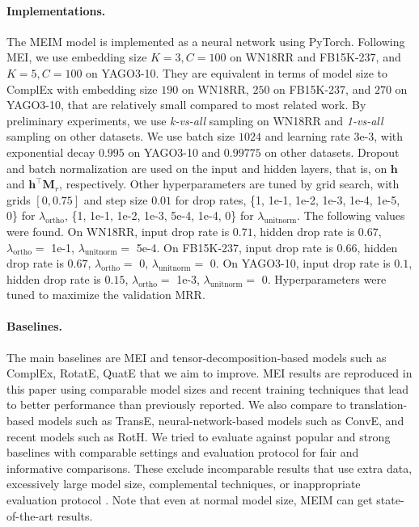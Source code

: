 \documentclass{article}
\def\vh{{\bm{h}}}
\def\mM{{\bm{M}}}
\theoremstyle{plain}
\theoremstyle{remark}
\begin{document}
\paragraph{Implementations.} The MEIM model is implemented as a neural network using PyTorch. Following MEI, we use embedding size $ K=3, C=100 $ on WN18RR and FB15K-237, and $ K=5, C=100 $ on YAGO3-10. They are equivalent in terms of model size to ComplEx with embedding size $ 190 $ on WN18RR, $ 250 $ on FB15K-237, and $ 270 $ on YAGO3-10, that are relatively small compared to most related work. By preliminary experiments, we use \textit{k-vs-all} sampling on WN18RR and \textit{1-vs-all} sampling on other datasets. We use batch size $ 1024 $ and learning rate 3e-3, with exponential decay $ 0.995 $ on YAGO3-10 and $ 0.99775 $ on other datasets. Dropout and batch normalization are used on the input and hidden layers, that is, on $ \vh $ and $ \vh^\top \mM_r $, respectively. Other hyperparameters are tuned by grid search, with grids $ [0, 0.75] $ and step size $ 0.01 $ for drop rates, \{1, 1e-1, 1e-2, 1e-3, 1e-4, 1e-5, 0\} for $ \lambda_{\text{ortho}} $, \{1, 1e-1, 1e-2, 1e-3, 5e-4, 1e-4, 0\} for $ \lambda_{\text{unitnorm}} $. The following values were found. On WN18RR, input drop rate is $ 0.71 $, hidden drop rate is $ 0.67 $, $ \lambda_{\text{ortho}} = $ 1e-1, $ \lambda_{\text{unitnorm}} = $ 5e-4. On FB15K-237, input drop rate is $ 0.66 $, hidden drop rate is $ 0.67 $, $ \lambda_{\text{ortho}} = $ 0, $ \lambda_{\text{unitnorm}} = $ 0. On YAGO3-10, input drop rate is $ 0.1 $, hidden drop rate is $ 0.15 $, $ \lambda_{\text{ortho}} = $ 1e-3, $ \lambda_{\text{unitnorm}} = $ 0. Hyperparameters were tuned to maximize the validation MRR.

\paragraph{Baselines.} The main baselines are MEI and tensor-decomposition-based models such as ComplEx, RotatE, QuatE that we aim to improve. MEI results are reproduced in this paper using comparable model sizes and recent training techniques that lead to better performance than previously reported. We also compare to translation-based models such as TransE, neural-network-based models such as ConvE, and recent models such as RotH. We tried to evaluate against popular and strong baselines with comparable settings and evaluation protocol for fair and informative comparisons. These exclude incomparable results that use extra data, excessively large model size, complemental techniques, or inappropriate evaluation protocol \cite{sun_reevaluationknowledgegraph_2020}. Note that even at normal model size, MEIM can get state-of-the-art results.
\end{document}
